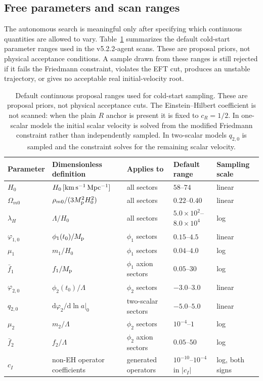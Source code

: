 \documentclass[aps,prd,twocolumn,superscriptaddress,nofootinbib,longbibliography]{revtex4-2}
\newcommand{\dd}{\mathrm{d}}
\newcommand{\Mp}{M_{\rm p}}
\newcommand{\Lam}{\Lambda}
\begin{document}
\subsection{Free parameters and scan ranges}
\label{subsec:parameter-priors}

The autonomous search is meaningful only after specifying which continuous quantities are allowed to vary.  Table~\ref{tab:parameter-priors} summarizes the default cold-start parameter ranges used in the v5.2.2-agent scans.  These are proposal priors, not physical acceptance conditions.  A sample drawn from these ranges is still rejected if it fails the Friedmann constraint, violates the EFT cut, produces an unstable trajectory, or gives no acceptable real initial-velocity root.

\begin{table}[t]
\centering
\begin{ruledtabular}
\begin{tabular}{lllll}
Parameter & Dimensionless definition & Applies to & Default range & Sampling scale \\
\hline
$H_0$ & $H_0\,[{\rm km\,s^{-1}\,Mpc^{-1}}]$ & all sectors & $58$--$74$ & linear \\
$\Omega_{m0}$ & $\rho_{m0}/(3\Mp^2H_0^2)$ & all sectors & $0.22$--$0.40$ & linear \\
$\lambda_H$ & $\Lam/H_0$ & all sectors & $5.0\times10^2$--$8.0\times10^4$ & log \\
$\varphi_{1,0}$ & $\phi_1(t_0)/\Mp$ & $\phi_1$ sectors & $0.15$--$4.5$ & linear \\
$\mu_1$ & $m_1/H_0$ & $\phi_1$ sectors & $0.04$--$4.0$ & log \\
$\bar f_1$ & $f_1/\Mp$ & $\phi_1$ axion sectors & $0.05$--$30$ & log \\
$\varphi_{2,0}$ & $\phi_2(t_0)/\Lam$ & $\phi_2$ sectors & $-3.0$--$3.0$ & linear \\
$q_{2,0}$ & $\dd\varphi_2/\dd\ln a|_{0}$ & two-scalar sectors & $-5.0$--$5.0$ & linear \\
$\mu_2$ & $m_2/\Lam$ & $\phi_2$ sectors & $10^{-4}$--$1$ & log \\
$\bar f_2$ & $f_2/\Lam$ & $\phi_2$ axion sectors & $0.05$--$50$ & log \\
$c_I$ & non-EH operator coefficients & generated operators & $10^{-10}$--$10^{-4}$ in $|c_I|$ & log, both signs \\
\end{tabular}
\end{ruledtabular}
\caption{Default continuous proposal ranges used for cold-start sampling.  These are proposal priors, not physical acceptance cuts.  The Einstein--Hilbert coefficient is not scanned: when the plain $R$ anchor is present it is fixed to $c_R=1/2$.  In one-scalar models the initial scalar velocity is solved from the modified Friedmann constraint rather than independently sampled.  In two-scalar models $q_{2,0}$ is sampled and the constraint solves for the remaining scalar velocity.}
\label{tab:parameter-priors}
\end{table}
\end{document}
